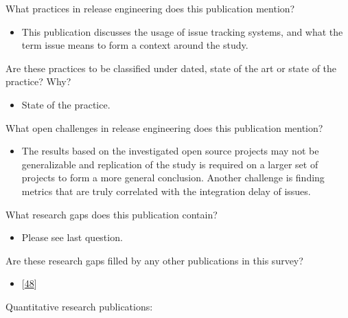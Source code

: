 \documentclass[]{book}
\providecommand{\tightlist}{%
  \setlength{\itemsep}{0pt}\setlength{\parskip}{0pt}}
\begin{document}
What practices in release engineering does this publication mention?

\begin{itemize}
\tightlist
\item
  This publication discusses the usage of issue tracking systems, and
  what the term issue means to form a context around the study.
\end{itemize}

Are these practices to be classified under dated, state of the art or
state of the practice? Why?

\begin{itemize}
\tightlist
\item
  State of the practice.
\end{itemize}

What open challenges in release engineering does this publication
mention?

\begin{itemize}
\tightlist
\item
  The results based on the investigated open source projects may not be
  generalizable and replication of the study is required on a larger set
  of projects to form a more general conclusion. Another challenge is
  finding metrics that are truly correlated with the integration delay
  of issues.
\end{itemize}

What research gaps does this publication contain?

\begin{itemize}
\tightlist
\item
  Please see last question.
\end{itemize}

Are these research gaps filled by any other publications in this survey?

\begin{itemize}
\tightlist
\item
  {[}\protect\hyperlink{ref-da2016a}{48}{]}
\end{itemize}

Quantitative research publications:
\end{document}
